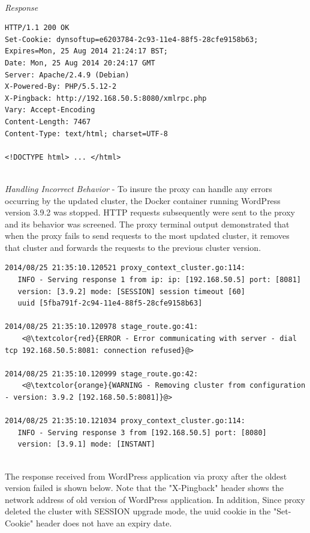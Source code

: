 \documentclass[a4paper,11pt,twoside]{report}
\begin{document}
\noindent\\
\textit{Response}
\begin{lstlisting}[language=terminal]
HTTP/1.1 200 OK
Set-Cookie: dynsoftup=e6203784-2c93-11e4-88f5-28cfe9158b63; Expires=Mon, 25 Aug 2014 21:24:17 BST;
Date: Mon, 25 Aug 2014 20:24:17 GMT
Server: Apache/2.4.9 (Debian)
X-Powered-By: PHP/5.5.12-2
X-Pingback: http://192.168.50.5:8080/xmlrpc.php
Vary: Accept-Encoding
Content-Length: 7467
Content-Type: text/html; charset=UTF-8

<!DOCTYPE html> ... </html>
\end{lstlisting}

\noindent\\
\textit{Handling Incorrect Behavior} - To insure the proxy can handle any errors occurring by the updated cluster, the Docker container running WordPress version 3.9.2 was stopped. HTTP requests subsequently were sent to the proxy and its behavior was screened. The proxy terminal output demonstrated that when the proxy fails to send requests to the most updated cluster, it removes that cluster and forwards the requests to the previous cluster version.  \smallskip

\begin{lstlisting}[language=terminal]
2014/08/25 21:35:10.120521 proxy_context_cluster.go:114:     
   INFO - Serving response 1 from ip: ip: [192.168.50.5] port: [8081] 
   version: [3.9.2] mode: [SESSION] session timeout [60] 
   uuid [5fba791f-2c94-11e4-88f5-28cfe9158b63]

2014/08/25 21:35:10.120978 stage_route.go:41:    
    <@\textcolor{red}{ERROR - Error communicating with server - dial tcp 192.168.50.5:8081: connection refused}@>
   
2014/08/25 21:35:10.120999 stage_route.go:42:  
    <@\textcolor{orange}{WARNING - Removing cluster from configuration - version: 3.9.2 [192.168.50.5:8081]}@>

2014/08/25 21:35:10.121034 proxy_context_cluster.go:114:     
   INFO - Serving response 3 from [192.168.50.5] port: [8080] 
   version: [3.9.1] mode: [INSTANT]
\end{lstlisting}
 
\noindent\\
The response received from WordPress application via proxy after the oldest version failed is shown below. Note that the "X-Pingback" header shows the network address of old version of WordPress application. In addition, Since proxy deleted the cluster with SESSION upgrade mode, the uuid cookie in the "Set-Cookie" header does not have an expiry date.\smallskip 
\end{document}

